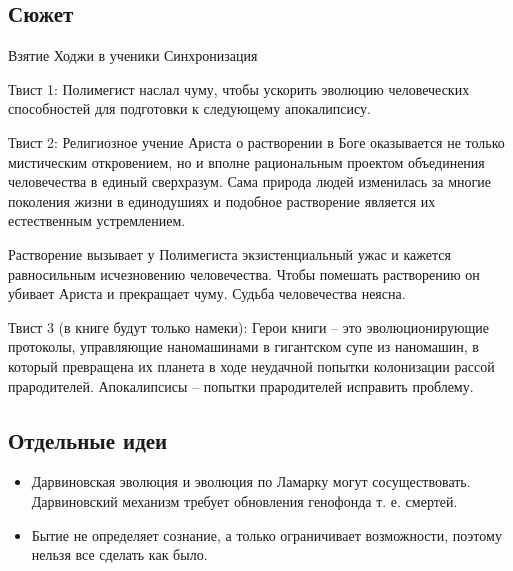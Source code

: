 \documentclass[12pt,a4paper]{article}
\begin{document}
\subsection*{Сюжет}

Взятие Ходжи в ученики
Синхронизация

Твист 1: Полимегист наслал чуму, чтобы ускорить эволюцию человеческих способностей для подготовки к следующему апокалипсису.

Твист 2: Религиозное учение Ариста о растворении в Боге оказывается не только мистическим откровением, но и вполне рациональным проектом объединения человечества в единый сверхразум. Сама природа людей изменилась за многие поколения жизни в единодушиях и подобное растворение является их естественным устремлением.

Растворение вызывает у Полимегиста экзистенциальный ужас и кажется равносильным исчезновению человечества. Чтобы помешать растворению он убивает Ариста и прекращает чуму. Судьба человечества неясна.

Твист 3 (в книге будут только намеки): Герои книги -- это эволюционирующие протоколы, управляющие наномашинами в гигантском супе из наномашин, в который превращена их планета в ходе неудачной попытки колонизации рассой прародителей. Апокалипсисы -- попытки прародителей исправить проблему.

\subsection*{Отдельные идеи}
\begin{itemize}
\item Дарвиновская эволюция и эволюция по Ламарку могут сосуществовать. Дарвиновский механизм требует обновления генофонда т. е. смертей.
\item Бытие не определяет сознание, а только ограничивает возможности, поэтому нельзя все сделать как было.
\end{itemize}
\end{document}
